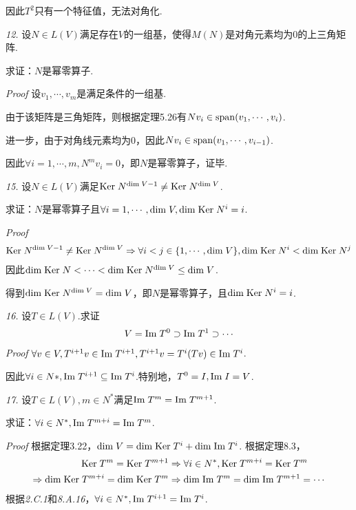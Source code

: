 因此\(T^2\)只有一个特征值，无法对角化.

\newpage

\textit{12.}
设\(N \in L(V)\)满足存在\(V\)的一组基，使得\(M(N)\)是对角元素均为\(0\)的上三角矩阵.

求证：\(N\)是幂零算子.

\textit{Proof}
设\(v_1,\cdots,v_m\)是满足条件的一组基.

由于该矩阵是三角矩阵，则根据定理5.26有\(Nv_i \in \mathrm{span} (v_1,\cdots,v_i)\).

进一步，由于对角线元素均为\(0\)，因此\(Nv_i \in \mathrm{span} (v_1,\cdots,v_{i-1})\).

因此\(\forall i=1,\cdots,m,N^m v_i=0\)，即\(N\)是幂零算子，证毕.

\hspace*{\fill}

\textit{15.}
设\(N \in L(V)\)满足\(\mathrm{Ker \;} N^{\mathrm{dim \;} V-1} \ne \mathrm{Ker \;} N^{\mathrm{dim \;} V}\).

求证：\(N\)是幂零算子且\(\forall i=1,\cdots,\mathrm{dim \;} V,\mathrm{dim \;} \mathrm{Ker \;} N^i=i\).

\textit{Proof}
    \begin{align*}
        \mathrm{Ker \;} N^{\mathrm{dim \;} V-1} \ne \mathrm{Ker \;} N^{\mathrm{dim \;} V} \Rightarrow 
        \forall i<j \in \{1,\cdots,\mathrm{dim \;} V\},\mathrm{dim \;} \mathrm{Ker \;} N^i<\mathrm{dim \;} \mathrm{Ker \;} N^j
    \end{align*}
因此\(\mathrm{dim \;} \mathrm{Ker \;} N<\cdots<\mathrm{dim \;} \mathrm{Ker \;} N^{\mathrm{dim \;} V} \leq \mathrm{dim \;} V\).

得到\(\mathrm{dim \;} \mathrm{Ker \;} N^{\mathrm{dim \;} V}=\mathrm{dim \;} V\)，即\(N\)是幂零算子，且\(\mathrm{dim \;} \mathrm{Ker \;} N^i=i\).

\hspace*{\fill}

\textit{16.}
设\(T \in L(V)\).求证
    \begin{align*}
        V=\mathrm{Im \;} T^0 \supset \mathrm{Im \;} T^1 \supset \cdots
    \end{align*}
\textit{Proof}
\(\forall v \in V,T^{i+1}v \in \mathrm{Im \;} T^{i+1},T^{i+1}v=T^i(Tv) \in \mathrm{Im \;} T^i\).

因此\(\forall i \in N*,\mathrm{Im \;} T^{i+1} \subseteq \mathrm{Im \;} T^i\).特别地，\(T^0=I,\mathrm{Im \;} I=V\).

\hspace*{\fill}

\textit{17.}
设\(T \in L(V),m \in N^*\)满足\(\mathrm{Im \;} T^m=\mathrm{Im \;} T^{m+1}\).

求证：\(\forall i \in N^*,\mathrm{Im \;} T^{m+i}=\mathrm{Im \;} T^m\).

\textit{Proof}
根据定理3.22，\(\mathrm{dim \;} V=\mathrm{dim \;} \mathrm{Ker \;} T^i+\mathrm{dim \;} \mathrm{Im \;} T^i\).
根据定理8.3，
    \begin{align*}
        \mathrm{Ker \;} T^m=\mathrm{Ker \;} T^{m+1} &\Rightarrow \forall i \in N^*,\mathrm{Ker \;} T^{m+i}=\mathrm{Ker \;} T^m \\
        \Rightarrow \mathrm{dim \;} \mathrm{Ker \;} T^{m+i}=\mathrm{dim \;} \mathrm{Ker \;} T^m
        &\Rightarrow \mathrm{dim \;} \mathrm{Im \;} T^m=\mathrm{dim \;} \mathrm{Im \;} T^{m+1}=\cdots
    \end{align*}
根据\textit{2.C.1}和\textit{8.A.16}，\(\forall i \in N^*,\mathrm{Im \;} T^{i+1}=\mathrm{Im \;} T^i\).

